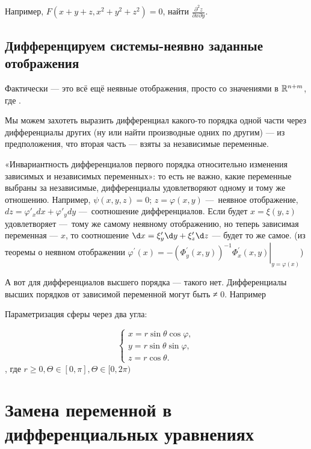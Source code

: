 \documentclass[12pt, a4paper]{article}
\begin{document}
Например, $F(x + y + z, x^2 + y^2 + z^2) = 0$, найти $\frac{\partial^2 z}{\partial x \partial y}$.

\subsection{Дифференцируем системы-неявно заданные отображения}

Фактически — это всё ещё неявные отображения, просто со значениями в ${\mathbb{R}}^{n + m}$, где .

Мы можем захотеть выразить дифференциал какого-то порядка одной части через дифференциалы других 
(ну или найти производные одних по другим) — из предположения, что вторая часть — взяты за независимые переменные.

«Инвариантность дифференциалов первого порядка относительно изменения зависимых и независимых переменных»:
то есть не важно, какие переменные выбраны за независимые, дифференциалы удовлетворяют одному и тому же отношению.
Например, $\psi(x, y, z) = 0$; $z = \varphi(x, y)$ — неявное отображение, $dz = \varphi'_x dx + \varphi'_y dy$ — соотношение дифференциалов. 
Если будет $x = \xi(y, z)$ удовлетворяет — тому же самому неявному отображению, 
но теперь зависимая переменная — $x$, то соотношение $\d x = \xi'_y \d y + \xi'_z \d z$ — будет то же самое.
(из теоремы о неявном отображении $\varphi^{\prime}(x)=-\left.\left(\Phi_y^{\prime}(x, y)\right)^{-1} \Phi_x^{\prime}(x, y)\right|_{y=\varphi(x)}$)


А вот для дифференциалов высшего порядка — такого нет. Дифференциалы высших порядков от зависимой переменной могут быть ≠ 0.
Например


Параметризация сферы через два угла:

\begin{equation}
  {\displaystyle {\begin{cases}x=r\sin \theta \cos \varphi ,\\y=r\sin \theta \sin \varphi ,\\z=r\cos \theta .\end{cases}}}
\end{equation}
, где $r \geq 0, \Theta \in [0, \pi], \Theta \in [0, 2\pi)$

\section{Замена переменной в дифференциальных уравнениях}
\end{document}
